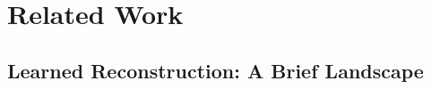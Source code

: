 %
%
%
%

\chapter{Related Work}
\label{chap:related-work}

\section{Learned Reconstruction: A Brief Landscape}
\label{sec:learned-landscape}



